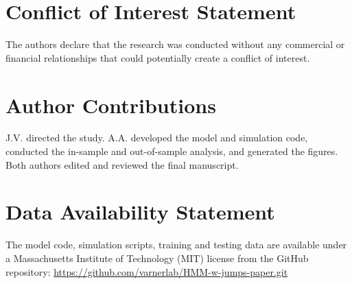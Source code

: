 \section*{Conflict of Interest Statement}
The authors declare that the research was conducted without any commercial or financial relationships that could potentially create a conflict of interest.

\section*{Author Contributions}
J.V. directed the study. A.A. developed the model and simulation code, conducted the in-sample and out-of-sample analysis, and generated the figures. Both authors edited and reviewed the final manuscript.

\section*{Data Availability Statement}
The model code, simulation scripts, training and testing data are available under a Massachusetts Institute of Technology (MIT) license from the GitHub repository: \url{https://github.com/varnerlab/HMM-w-jumps-paper.git}
